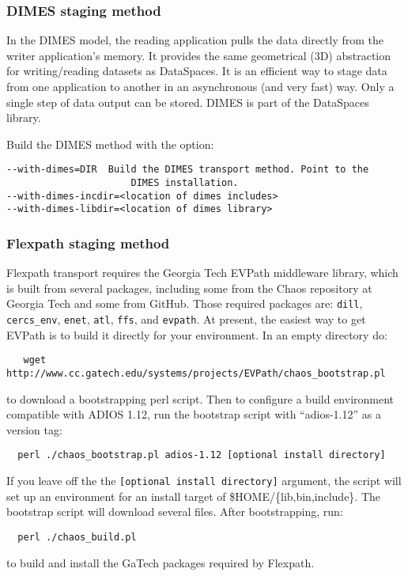 \subsubsection{DIMES staging method}
In the DIMES model, the reading application pulls the data directly from the writer application's memory. It provides the same geometrical (3D) abstraction for writing/reading datasets as DataSpaces. It is an efficient way to stage data from one application to another in an asynchronous (and very fast) way. Only a single step of data output can be stored.
DIMES is part of the DataSpaces library.

\noindent Build the DIMES method with the option:

\begin{lstlisting}
--with-dimes=DIR  Build the DIMES transport method. Point to the
                      DIMES installation.
--with-dimes-incdir=<location of dimes includes>
--with-dimes-libdir=<location of dimes library>
\end{lstlisting}


\subsubsection{Flexpath staging method}
 Flexpath transport requires the Georgia Tech EVPath middleware library,
 which is built from several packages, including some from the Chaos
 repository at Georgia Tech and some from GitHub.  Those required packages
 are: \verb+dill+, \verb+cercs_env+, \verb+enet+, \verb+atl+, \verb+ffs+,
 and \verb+evpath+. 
At present, the easiest way to get EVPath is to build it directly for your environment. In an empty directory do:
\begin{lstlisting}
   wget http://www.cc.gatech.edu/systems/projects/EVPath/chaos_bootstrap.pl
\end{lstlisting}
to download a bootstrapping perl script.  Then to configure a build
environment compatible with ADIOS 1.12, run the bootstrap script with
``adios-1.12'' as a version tag:
\begin{lstlisting}
  perl ./chaos_bootstrap.pl adios-1.12 [optional install directory]
\end{lstlisting}

If you leave off the the \verb+[optional install directory]+ argument, the
script will set up an environment for an install target of
\$HOME/\{lib,bin,include\}.  The bootstrap script will download several
files.  After bootstrapping, run:
\begin{lstlisting}
  perl ./chaos_build.pl 
\end{lstlisting}
to build and install the GaTech packages required by Flexpath.

